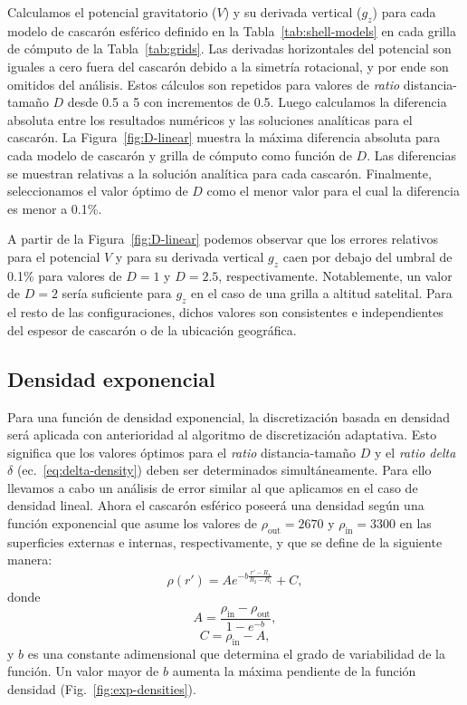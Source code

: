 Calculamos el potencial gravitatorio ($V$) y su derivada vertical ($g_z$)
para cada modelo de cascarón esférico definido en la
Tabla~\ref{tab:shell-models} en cada grilla de cómputo de la
Tabla~\ref{tab:grids}.
Las derivadas horizontales del potencial son iguales a cero fuera del cascarón
debido a la simetría rotacional, y por ende son omitidos del análisis.
Estos cálculos son repetidos para valores de \emph{ratio} distancia-tamaño $D$
desde 0.5 a 5 con incrementos de 0.5.
Luego calculamos la diferencia absoluta entre los resultados numéricos y las
soluciones analíticas para el cascarón.
La Figura~\ref{fig:D-linear} muestra la máxima diferencia absoluta para cada
modelo de cascarón y grilla de cómputo como función de $D$.
Las diferencias se muestran relativas a la solución analítica para cada
cascarón.
Finalmente, seleccionamos el valor óptimo de $D$ como el menor valor para el
cual la diferencia es menor a 0.1\%.

A partir de la Figura~\ref{fig:D-linear} podemos observar que los errores
relativos para el potencial $V$ y para su derivada vertical $g_z$ caen por
debajo del umbral de 0.1\% para valores de $D=1$ y $D=2.5$, respectivamente.
Notablemente, un valor de $D=2$ sería suficiente para $g_z$ en el caso de una
grilla a altitud satelital.
Para el resto de las configuraciones, dichos valores son consistentes
e independientes del espesor de cascarón o de la ubicación geográfica.


\subsection{Densidad exponencial}

Para una función de densidad exponencial, la discretización basada en densidad
será aplicada con anterioridad al algoritmo de discretización adaptativa.
Esto significa que los valores óptimos para el \emph{ratio} distancia-tamaño
$D$ y el \emph{ratio delta} $\delta$ (ec.~\ref{eq:delta-density}) deben ser
determinados simultáneamente.
Para ello llevamos a cabo un análisis de error similar al que aplicamos en el
caso de densidad lineal.
Ahora el cascarón esférico poseerá una densidad según una función exponencial
que asume los valores de $\rho_\text{out} = 2670$\kgpercubicm{}
y $\rho_\text{in} = 3300$\kgpercubicm{} en las superficies externas
e internas, respectivamente, y que se define de la siguiente manera:
%
\begin{equation}
    \rho(r') = A e^{- b \frac{r' - R_1}{R_2 - R_1}} + C,
    \label{eq:density-exp}
\end{equation}
%
donde
%
\begin{equation}
    A = \frac{\rho_\text{in} - \rho_\text{out}}{1 - e^{-b}},
\end{equation}
%
\begin{equation}
    C = \rho_\text{in} - A,
\end{equation}
%
y $b$ es una constante adimensional que determina el grado de
variabilidad de la función. Un valor mayor de $b$ aumenta la máxima pendiente
de la función densidad (Fig.~\ref{fig:exp-densities}).

